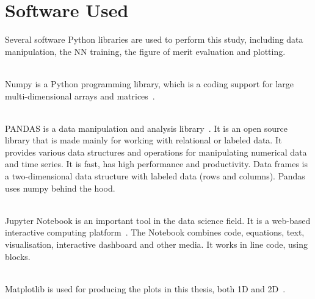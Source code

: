 \section{Software Used}

Several software Python libraries are used to perform this study, including data manipulation, the NN training, the figure of merit evaluation and plotting.

\ \\Numpy is a Python programming library, which is a coding support for large multi-dimensional arrays and matrices~\cite{Numpy}. 

\ \\PANDAS is a data manipulation and analysis library~\cite{PANDAS}. It is an open source library that is made mainly for working with relational or labeled data. It provides various data structures and operations for manipulating numerical data and time series. It is fast, has high performance and productivity. Data frames is a two-dimensional data structure with labeled data (rows and columns). Pandas uses numpy behind the hood. 

\ \\Jupyter Notebook is an important tool in the data science field. It is a web-based interactive computing platform~\cite{JupyterNotebook}. The Notebook combines code, equations, text, visualisation, interactive dashboard and other media. It works in line code, using blocks. 

\ \\Matplotlib is used for producing the plots in this thesis, both 1D and 2D~\cite{Matplotlib}.


